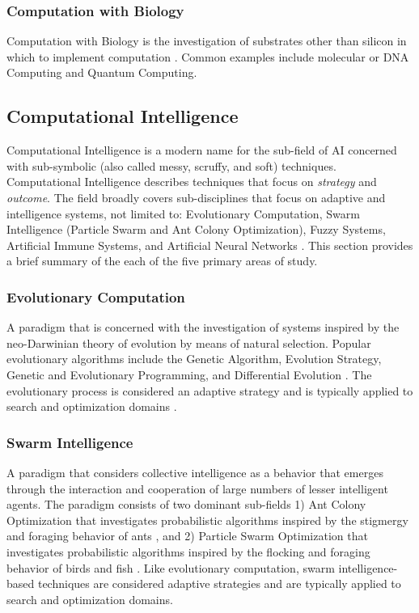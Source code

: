\begin{bibunit}
\subsubsection{Computation with Biology}
Computation with Biology is the investigation of substrates other than silicon in which to implement computation \cite{Aaronson2005}. Common examples include molecular or DNA Computing and Quantum Computing.

% 
% 
\subsection{Computational Intelligence}
\label{sec:computationl_intelligence}
Computational Intelligence is a modern name for the sub-field of AI concerned with sub-symbolic (also called messy, scruffy, and soft) techniques. Computational Intelligence describes techniques that focus on \emph{strategy} and \emph{outcome}. 
The field broadly covers sub-disciplines that focus on adaptive and intelligence systems, not limited to: Evolutionary Computation, Swarm Intelligence (Particle Swarm and Ant Colony Optimization), Fuzzy Systems, Artificial Immune Systems, and Artificial Neural Networks \cite{Engelbrecht2007, Pedrycz1997}. This section provides a brief summary of the each of the five primary areas of study.

\subsubsection{Evolutionary Computation} 
A paradigm that is concerned with the investigation of systems inspired by the neo-Darwinian theory of evolution by means of natural selection. Popular evolutionary algorithms include the Genetic Algorithm, Evolution Strategy, Genetic and Evolutionary Programming, and Differential Evolution \cite{Baeck2000, Baeck2000a}. The evolutionary process is considered an adaptive strategy and is typically applied to search and optimization domains \cite{Goldberg1989, Holland1975}.

\subsubsection{Swarm Intelligence} 
A paradigm that considers collective intelligence as a behavior that emerges through the interaction and cooperation of large numbers of lesser intelligent agents. The paradigm consists of two dominant sub-fields 1) Ant Colony Optimization that investigates probabilistic algorithms inspired by the stigmergy and foraging behavior of ants \cite{Bonabeau1999, Dorigo2004}, and 2) Particle Swarm Optimization that investigates probabilistic algorithms inspired by the flocking and foraging behavior of birds and fish \cite{Kennedy2001}. Like evolutionary computation, swarm intelligence-based techniques are considered adaptive strategies and are typically applied to search and optimization domains.


\end{bibunit}
